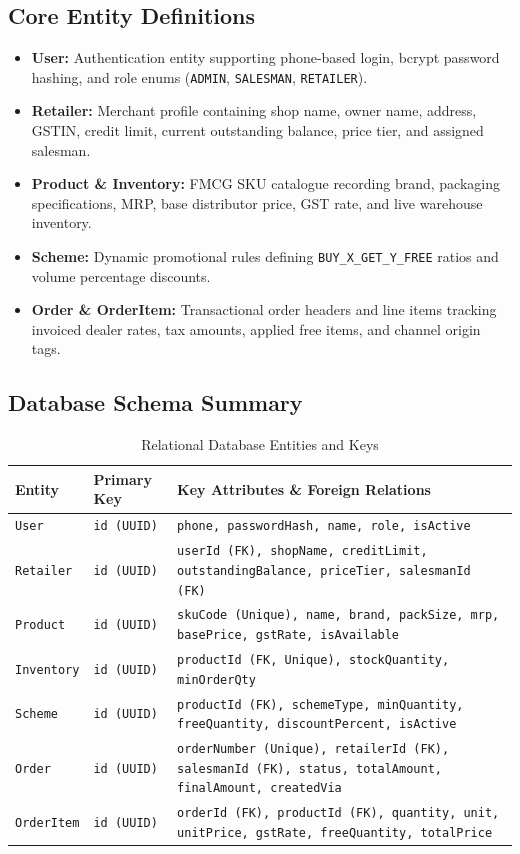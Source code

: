 \documentclass[11pt,a4paper]{article}
\begin{document}
\subsection{Core Entity Definitions}
\begin{itemize}[leftmargin=1.5cm]
    \item \textbf{User:} Authentication entity supporting phone-based login, bcrypt password hashing, and role enums (\texttt{ADMIN}, \texttt{SALESMAN}, \texttt{RETAILER}).
    \item \textbf{Retailer:} Merchant profile containing shop name, owner name, address, GSTIN, credit limit, current outstanding balance, price tier, and assigned salesman.
    \item \textbf{Product \& Inventory:} FMCG SKU catalogue recording brand, packaging specifications, MRP, base distributor price, GST rate, and live warehouse inventory.
    \item \textbf{Scheme:} Dynamic promotional rules defining \texttt{BUY\_X\_GET\_Y\_FREE} ratios and volume percentage discounts.
    \item \textbf{Order \& OrderItem:} Transactional order headers and line items tracking invoiced dealer rates, tax amounts, applied free items, and channel origin tags.
\end{itemize}

\subsection{Database Schema Summary}

\begin{table}[h!]
\centering
\small
\begin{tabularx}{\textwidth}{l l X}
\toprule
\textbf{Entity} & \textbf{Primary Key} & \textbf{Key Attributes \& Foreign Relations} \\
\midrule
\texttt{User} & \texttt{id (UUID)} & \texttt{phone, passwordHash, name, role, isActive} \\
\texttt{Retailer} & \texttt{id (UUID)} & \texttt{userId (FK), shopName, creditLimit, outstandingBalance, priceTier, salesmanId (FK)} \\
\texttt{Product} & \texttt{id (UUID)} & \texttt{skuCode (Unique), name, brand, packSize, mrp, basePrice, gstRate, isAvailable} \\
\texttt{Inventory} & \texttt{id (UUID)} & \texttt{productId (FK, Unique), stockQuantity, minOrderQty} \\
\texttt{Scheme} & \texttt{id (UUID)} & \texttt{productId (FK), schemeType, minQuantity, freeQuantity, discountPercent, isActive} \\
\texttt{Order} & \texttt{id (UUID)} & \texttt{orderNumber (Unique), retailerId (FK), salesmanId (FK), status, totalAmount, finalAmount, createdVia} \\
\texttt{OrderItem} & \texttt{id (UUID)} & \texttt{orderId (FK), productId (FK), quantity, unit, unitPrice, gstRate, freeQuantity, totalPrice} \\
\bottomrule
\end{tabularx}
\caption{Relational Database Entities and Keys}
\end{table}
\end{document}
